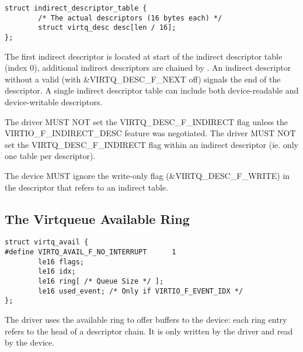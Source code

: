 \begin{lstlisting}
struct indirect_descriptor_table {
        /* The actual descriptors (16 bytes each) */
        struct virtq_desc desc[len / 16];
};
\end{lstlisting}

The first indirect descriptor is located at start of the indirect
descriptor table (index 0), additional indirect descriptors are
chained by . An indirect descriptor without a valid 
(with \&VIRTQ_DESC_F_NEXT off) signals the end of the descriptor.
A single indirect descriptor
table can include both device-readable and device-writable descriptors.

The driver MUST NOT set the VIRTQ_DESC_F_INDIRECT flag unless the
VIRTIO_F_INDIRECT_DESC feature was negotiated.   The driver MUST NOT
set the VIRTQ_DESC_F_INDIRECT flag within an indirect descriptor (ie. only
one table per descriptor).

The device MUST ignore the write-only flag (\&VIRTQ_DESC_F_WRITE) in the descriptor that refers to an indirect table.

\subsection{The Virtqueue Available Ring}\label{sec:Basic Facilities of a Virtio Device / Virtqueues / The Virtqueue Available Ring}

\begin{lstlisting}
struct virtq_avail {
#define VIRTQ_AVAIL_F_NO_INTERRUPT      1
        le16 flags;
        le16 idx;
        le16 ring[ /* Queue Size */ ];
        le16 used_event; /* Only if VIRTIO_F_EVENT_IDX */
};
\end{lstlisting}

The driver uses the available ring to offer buffers to the
device: each ring entry refers to the head of a descriptor chain.  It is only
written by the driver and read by the device.

